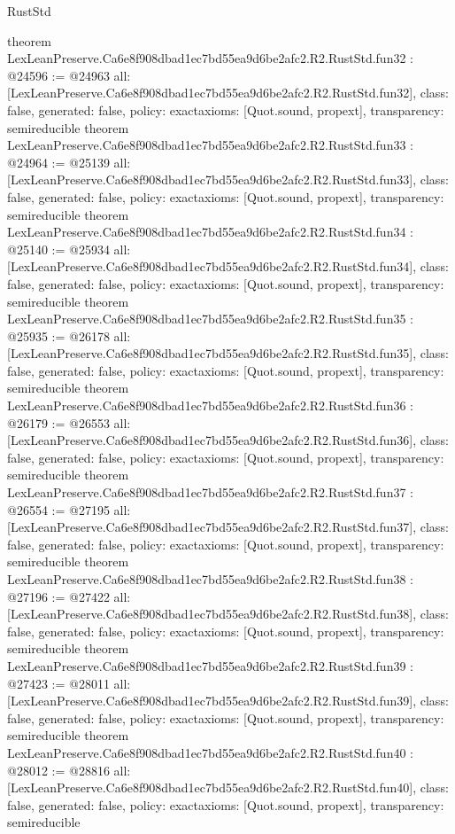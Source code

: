 \begin{lexlean}{RustStd}
\begin{coremodule}
{}
theorem LexLeanPreserve.Ca6e8f908dbad1ec7bd55ea9d6be2afc2.R2.RustStd.fun32 : @24596 := @24963 {
  all: [LexLeanPreserve.Ca6e8f908dbad1ec7bd55ea9d6be2afc2.R2.RustStd.fun32],
  class: false,
  generated: false,
  policy: exact{axioms: [Quot.sound, propext]},
  transparency: semireducible
}
theorem LexLeanPreserve.Ca6e8f908dbad1ec7bd55ea9d6be2afc2.R2.RustStd.fun33 : @24964 := @25139 {
  all: [LexLeanPreserve.Ca6e8f908dbad1ec7bd55ea9d6be2afc2.R2.RustStd.fun33],
  class: false,
  generated: false,
  policy: exact{axioms: [Quot.sound, propext]},
  transparency: semireducible
}
theorem LexLeanPreserve.Ca6e8f908dbad1ec7bd55ea9d6be2afc2.R2.RustStd.fun34 : @25140 := @25934 {
  all: [LexLeanPreserve.Ca6e8f908dbad1ec7bd55ea9d6be2afc2.R2.RustStd.fun34],
  class: false,
  generated: false,
  policy: exact{axioms: [Quot.sound, propext]},
  transparency: semireducible
}
theorem LexLeanPreserve.Ca6e8f908dbad1ec7bd55ea9d6be2afc2.R2.RustStd.fun35 : @25935 := @26178 {
  all: [LexLeanPreserve.Ca6e8f908dbad1ec7bd55ea9d6be2afc2.R2.RustStd.fun35],
  class: false,
  generated: false,
  policy: exact{axioms: [Quot.sound, propext]},
  transparency: semireducible
}
theorem LexLeanPreserve.Ca6e8f908dbad1ec7bd55ea9d6be2afc2.R2.RustStd.fun36 : @26179 := @26553 {
  all: [LexLeanPreserve.Ca6e8f908dbad1ec7bd55ea9d6be2afc2.R2.RustStd.fun36],
  class: false,
  generated: false,
  policy: exact{axioms: [Quot.sound, propext]},
  transparency: semireducible
}
theorem LexLeanPreserve.Ca6e8f908dbad1ec7bd55ea9d6be2afc2.R2.RustStd.fun37 : @26554 := @27195 {
  all: [LexLeanPreserve.Ca6e8f908dbad1ec7bd55ea9d6be2afc2.R2.RustStd.fun37],
  class: false,
  generated: false,
  policy: exact{axioms: [Quot.sound, propext]},
  transparency: semireducible
}
theorem LexLeanPreserve.Ca6e8f908dbad1ec7bd55ea9d6be2afc2.R2.RustStd.fun38 : @27196 := @27422 {
  all: [LexLeanPreserve.Ca6e8f908dbad1ec7bd55ea9d6be2afc2.R2.RustStd.fun38],
  class: false,
  generated: false,
  policy: exact{axioms: [Quot.sound, propext]},
  transparency: semireducible
}
theorem LexLeanPreserve.Ca6e8f908dbad1ec7bd55ea9d6be2afc2.R2.RustStd.fun39 : @27423 := @28011 {
  all: [LexLeanPreserve.Ca6e8f908dbad1ec7bd55ea9d6be2afc2.R2.RustStd.fun39],
  class: false,
  generated: false,
  policy: exact{axioms: [Quot.sound, propext]},
  transparency: semireducible
}
theorem LexLeanPreserve.Ca6e8f908dbad1ec7bd55ea9d6be2afc2.R2.RustStd.fun40 : @28012 := @28816 {
  all: [LexLeanPreserve.Ca6e8f908dbad1ec7bd55ea9d6be2afc2.R2.RustStd.fun40],
  class: false,
  generated: false,
  policy: exact{axioms: [Quot.sound, propext]},
  transparency: semireducible
}
\end{coremodule}
\end{lexlean}
